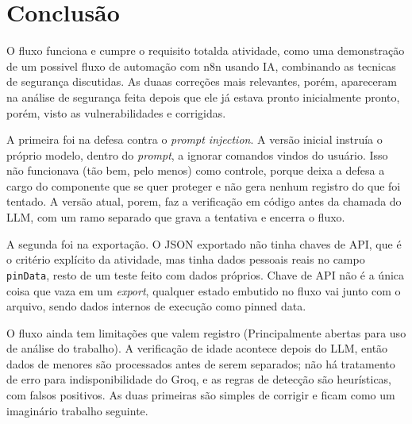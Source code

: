 \documentclass[article,11pt,oneside,a4paper,brazil,section=TITLE]{abntex2}
\begin{document}
\section{Conclusão}

O fluxo funciona e cumpre o requisito totalda atividade, como uma demonstração de um possivel fluxo de automação com n8n usando IA, combinando as tecnicas de segurança discutidas. As duaas correções mais relevantes, porém, apareceram na análise de segurança feita depois que ele já estava pronto inicialmente pronto, porém, visto as vulnerabilidades e corrigidas.

A primeira foi na defesa contra o \emph{prompt injection}. A versão inicial instruía o próprio modelo, dentro do \emph{prompt}, a ignorar comandos vindos do usuário. Isso não funcionava (tão bem, pelo menos) como controle, porque deixa a defesa a cargo do componente que se quer proteger e não gera nenhum registro do que foi tentado. A versão atual, porem, faz a verificação em código antes da chamada do LLM, com um ramo separado que grava a tentativa e encerra o fluxo.

A segunda foi na exportação. O JSON exportado não tinha chaves de API, que é o critério explícito da atividade, mas tinha dados pessoais reais no campo \texttt{pinData}, resto de um teste feito com dados próprios. Chave de API não é a única coisa que vaza em um \emph{export}, qualquer estado embutido no fluxo vai junto com o arquivo, sendo dados internos de execução como pinned data.

O fluxo ainda tem limitações que valem registro (Principalmente abertas para uso de análise do trabalho). A verificação de idade acontece depois do LLM, então dados de menores são processados antes de serem separados; não há tratamento de erro para indisponibilidade do Groq, e as regras de detecção são heurísticas, com falsos positivos. As duas primeiras são simples de corrigir e ficam como um imaginário trabalho seguinte.



\end{document}
